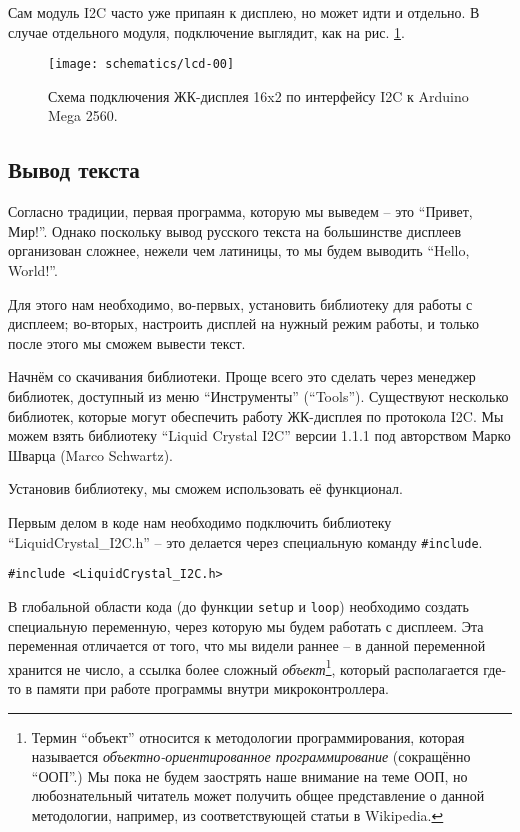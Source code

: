 \documentclass[../sparc.tex]{subfiles}
\begin{document}
Сам модуль I2C часто уже припаян к дисплею, но может идти и отдельно.  В случае
отдельного модуля, подключение выглядит, как на рис. \ref{fig:lcd-00}.

\begin{figure}[ht]
  \centering
  \texttt{[image: schematics/lcd-00]}
  \caption{Схема подключения ЖК-дисплея 16x2 по интерфейсу I2C к Arduino Mega
    2560.}
  \label{fig:lcd-00}
\end{figure}

\subsection{Вывод текста}


Согласно традиции, первая программа, которую мы выведем -- это ``Привет, Мир!''.
Однако поскольку вывод русского текста на большинстве дисплеев организован
сложнее, нежели чем латиницы, то мы будем выводить ``Hello, World!''.

Для этого нам необходимо, во-первых, установить библиотеку для работы с
дисплеем; во-вторых, настроить дисплей на нужный режим работы, и только после
этого мы сможем вывести текст.

Начнём со скачивания библиотеки.  Проще всего это сделать через менеджер
библиотек, доступный из меню ``Инструменты'' (``Tools'').  Существуют несколько
библиотек, которые могут обеспечить работу ЖК-дисплея по протокола I2C.  Мы
можем взять библиотеку ``Liquid Crystal I2C'' версии 1.1.1 под авторством Марко
Шварца (Marco Schwartz).

Установив библиотеку, мы сможем использовать её функционал.

Первым делом в коде нам необходимо подключить библиотеку
``LiquidCrystal\_I2C.h'' -- это делается через специальную команду
\texttt{\#include}.

\begin{verbatim}
#include <LiquidCrystal_I2C.h>
\end{verbatim}

В глобальной области кода (до функции \texttt{setup} и \texttt{loop}) необходимо
создать специальную переменную, через которую мы будем работать с дисплеем. Эта
переменная отличается от того, что мы видели раннее -- в данной переменной
хранится не число, а ссылка более сложный \emph{объект}\footnote{Термин
``объект'' относится к методологии программирования, которая называется
\emph{объектно-ориентированное программирование} (сокращённо ``ООП''.)  Мы пока
не будем заострять наше внимание на теме ООП, но любознательный читатель может
получить общее представление о данной методологии, например, из соответствующей
статьи в Wikipedia.}, который располагается где-то в памяти при работе программы
внутри микроконтроллера.
\end{document}
